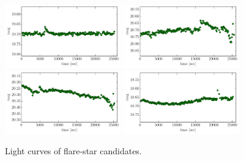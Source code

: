 \documentclass[iop, apj]{emulateapj}
\newcommand{\?}{\stackrel{?}{=}}
\begin{document}
\begin{figure}[h]
\includegraphics[width=5cm,clip,angle=90]{pic/flare/cand_21.pdf}
\includegraphics[width=5cm,clip,angle=90]{pic/flare/cand_22.pdf}
\includegraphics[width=5cm,clip,angle=90]{pic/flare/cand_23.pdf}
\includegraphics[width=5cm,clip,angle=90]{pic/flare/cand_24.pdf}
\caption{{\small
Light curves of flare-star candidates.
}}
\label{fig:candflare}
\end{figure}



\end{document}
